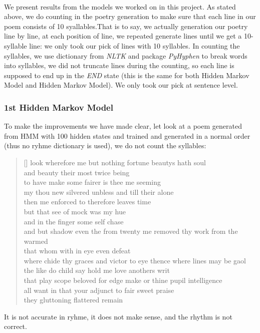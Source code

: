 %
\paragraph{}
We present results from the models we worked on in this project. As stated above, we do counting in the poetry generation to make sure that each line in our poem consists of 10 syallables.That is to say, we actually generation our poetry line by line, at each position of line, we repeated generate lines until we get a 10-syllable line: we only took our pick of lines with 10 syllables. In counting the syllables, we use dictionary from \textit{NLTK} and package \textit{PyHyphen} to break words into syllables, we did not truncate lines during the counting, so each line is supposed to end up in the \textit{END} state (this is the same for both Hidden Markov Model and Hidden Markov Model). We only took our pick at sentence level.
\subsubsection{1st Hidden Markov Model}
To make the improvements we have made clear, let look at a poem generated from HMM with 100 hidden states and trained and generated in a normal order (thus no ryhme dictionary is used), we do not count the syllables:
\settowidth{\versewidth}{even  see  shall  accessary  used  must  find  and  herself  enfeebled  mine  it}

\begin{verse}[\versewidth]
 look  wherefore  me  but  nothing  fortune  beautys  hath  soul\\
 and  beauty  their  most  twice  being \\
 to  have  make  some  fairer  is  thee  me  seeming \\
 my  thou  new  silvered  unbless  and  till  their  alone \\
 then  me  enforced  to  therefore  leaves  time \\
 but  that  see  of  mock  was  my  hue \\
 and  in  the  finger  some  self  chase \\
 and  but  shadow  even  the  from  twenty  me  removed  thy  work  from  the  warmed \\
 that  whom  with  in  eye  even  defeat \\
 where  chide  thy  graces  and  victor  to  eye  thence  where  lines  may  be  gaol \\
 the  like  do  child  say  hold  me  love  anothers  writ \\
 that  play  scope  beloved  for  edge  make  or  thine  pupil  intelligence \\
 all  want  in  that  your  adjunct  to  fair  sweet  praise \\
 they  gluttoning  flattered  remain \\
\end{verse}
It is not accurate in ryhme, it does not make sense, and the rhythm is not correct.
